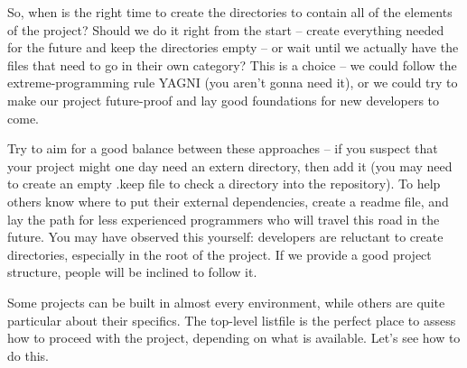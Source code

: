 So, when is the right time to create the directories to contain all of the elements of the project? Should we do it right from the start – create everything needed for the future and keep the directories empty – or wait until we actually have the files that need to go in their own category? This is a choice – we could follow the extreme-programming rule YAGNI (you aren't gonna need it), or we could try to make our project future-proof and lay good foundations for new developers to come.

Try to aim for a good balance between these approaches – if you suspect that your project might one day need an extern directory, then add it (you may need to create an empty .keep file to check a directory into the repository). To help others know where to put their external dependencies, create a readme file, and lay the path for less experienced programmers who will travel this road in the future. You may have observed this yourself: developers are reluctant to create directories, especially in the root of the project. If we provide a good project structure, people will be inclined to follow it.

Some projects can be built in almost every environment, while others are quite particular about their specifics. The top-level listfile is the perfect place to assess how to proceed with the project, depending on what is available. Let's see how to do this.





